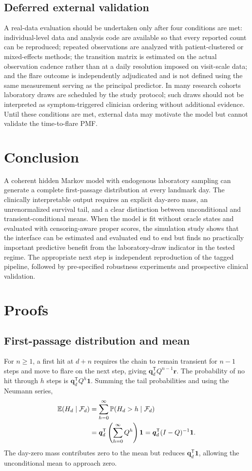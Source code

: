 \documentclass{ieeeaccess}
\newcommand{\trans}{\mathsf T}
\newcommand{\vect}[1]{\bm{#1}}
\newcommand{\Prb}{\mathbb P}
\newcommand{\E}{\mathbb E}
\begin{document}
\subsection{Deferred external validation}
A real-data evaluation should be undertaken only after four conditions are met: individual-level data and analysis code are available so that every reported count can be reproduced; repeated observations are analyzed with patient-clustered or mixed-effects methods; the transition matrix is estimated on the actual observation cadence rather than at a daily resolution imposed on visit-scale data; and the flare outcome is independently adjudicated and is not defined using the same measurement serving as the principal predictor. In many research cohorts laboratory draws are scheduled by the study protocol; such draws should not be interpreted as symptom-triggered clinician ordering without additional evidence. Until these conditions are met, external data may motivate the model but cannot validate the time-to-flare PMF.

\section{Conclusion}
A coherent hidden Markov model with endogenous laboratory sampling can generate a complete first-passage distribution at every landmark day. The clinically interpretable output requires an explicit day-zero mass, an unrenormalized survival tail, and a clear distinction between unconditional and transient-conditional means. When the model is fit without oracle states and evaluated with censoring-aware proper scores, the simulation study shows that the interface can be estimated and evaluated end to end but finds no practically important predictive benefit from the laboratory-draw indicator in the tested regime. The appropriate next step is independent reproduction of the tagged pipeline, followed by pre-specified robustness experiments and prospective clinical validation.

\appendices
\section{\texorpdfstring{\break}{}Proofs}\label{app:proofs}
\subsection{First-passage distribution and mean}
For $n\ge1$, a first hit at $d+n$ requires the chain to remain transient for $n-1$ steps and move to flare on the next step, giving $\vect{q}_d^{\trans}Q^{n-1}\vect{r}$. The probability of no hit through $h$ steps is $\vect{q}_d^{\trans}Q^h\vect{1}$. Summing the tail probabilities and using the Neumann series,
\begin{align}
\E(H_d\mid\mathcal F_d)
&=\sum_{h=0}^{\infty}\Prb(H_d>h\mid\mathcal F_d)\notag\\
&=\vect{q}_d^{\trans}\left(\sum_{h=0}^{\infty}Q^h\right)\vect{1}
=\vect{q}_d^{\trans}(I-Q)^{-1}\vect{1}.
\end{align}
The day-zero mass contributes zero to the mean but reduces $\vect{q}_d^{\trans}\vect{1}$, allowing the unconditional mean to approach zero.
\end{document}
